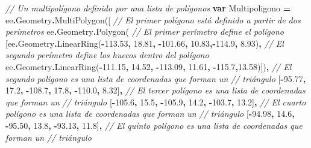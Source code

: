 \documentclass[
  12pt,
  letterpaper,
  twoside]{book}
\newenvironment{Shaded}{\begin{snugshade}}{\end{snugshade}}
\newcommand{\AttributeTok}[1]{\textcolor[rgb]{0.77,0.63,0.00}{#1}}
\newcommand{\CommentTok}[1]{\textcolor[rgb]{0.56,0.35,0.01}{\textit{#1}}}
\newcommand{\FloatTok}[1]{\textcolor[rgb]{0.00,0.00,0.81}{#1}}
\newcommand{\FunctionTok}[1]{\textcolor[rgb]{0.00,0.00,0.00}{#1}}
\newcommand{\KeywordTok}[1]{\textcolor[rgb]{0.13,0.29,0.53}{\textbf{#1}}}
\newcommand{\NormalTok}[1]{#1}
\newcommand{\OperatorTok}[1]{\textcolor[rgb]{0.81,0.36,0.00}{\textbf{#1}}}
\begin{document}
\begin{Shaded}
\begin{Highlighting}[]
\CommentTok{// Un multipolígono definido por una lista de polígonos}
\KeywordTok{var}\NormalTok{ Multipoligono }\OperatorTok{=}\NormalTok{ ee}\OperatorTok{.}\AttributeTok{Geometry}\OperatorTok{.}\FunctionTok{MultiPolygon}\NormalTok{([}
    \CommentTok{// El primer polígono está definido a partir de dos perímetros}
\NormalTok{    ee}\OperatorTok{.}\AttributeTok{Geometry}\OperatorTok{.}\FunctionTok{Polygon}\NormalTok{(  }
\CommentTok{// El primer perímetro define el polígono                }
\NormalTok{      [ee}\OperatorTok{.}\AttributeTok{Geometry}\OperatorTok{.}\FunctionTok{LinearRing}\NormalTok{(}\OperatorTok{{-}}\FloatTok{113.53}\OperatorTok{,} \FloatTok{18.81}\OperatorTok{,} \OperatorTok{{-}}\FloatTok{101.66}\OperatorTok{,} \FloatTok{10.83}\OperatorTok{,{-}}\FloatTok{114.9}\OperatorTok{,} \FloatTok{8.93}\NormalTok{)}\OperatorTok{,}    
      \CommentTok{// El segundo perímetro define los huecos dentro del polígono}
\NormalTok{ee}\OperatorTok{.}\AttributeTok{Geometry}\OperatorTok{.}\FunctionTok{LinearRing}\NormalTok{(}\OperatorTok{{-}}\FloatTok{111.15}\OperatorTok{,} \FloatTok{14.52}\OperatorTok{,} \OperatorTok{{-}}\FloatTok{113.09}\OperatorTok{,} \FloatTok{11.61}\OperatorTok{,} \OperatorTok{{-}}\FloatTok{115.7}\OperatorTok{,}\FloatTok{13.58}\NormalTok{)])}\OperatorTok{,}
    \CommentTok{// El segundo polígono es una lista de coordenadas que forman un }
    \CommentTok{// triángulo}
\NormalTok{    [}\OperatorTok{{-}}\FloatTok{95.77}\OperatorTok{,} \FloatTok{17.2}\OperatorTok{,}
     \OperatorTok{{-}}\FloatTok{108.7}\OperatorTok{,} \FloatTok{17.8}\OperatorTok{,}
     \OperatorTok{{-}}\FloatTok{110.0}\OperatorTok{,} \FloatTok{8.32}\NormalTok{]}\OperatorTok{,}
    \CommentTok{// El tercer polígono es una lista de coordenadas que forman un }
    \CommentTok{// triángulo}
\NormalTok{    [}\OperatorTok{{-}}\FloatTok{105.6}\OperatorTok{,} \FloatTok{15.5}\OperatorTok{,}                
     \OperatorTok{{-}}\FloatTok{105.9}\OperatorTok{,} \FloatTok{14.2}\OperatorTok{,}
     \OperatorTok{{-}}\FloatTok{103.7}\OperatorTok{,} \FloatTok{13.2}\NormalTok{]}\OperatorTok{,}
    \CommentTok{// El cuarto polígono es una lista de coordenadas que forman un }
    \CommentTok{// triángulo}
\NormalTok{    [}\OperatorTok{{-}}\FloatTok{94.98}\OperatorTok{,} \FloatTok{14.6}\OperatorTok{,}         
     \OperatorTok{{-}}\FloatTok{95.50}\OperatorTok{,} \FloatTok{13.8}\OperatorTok{,}
     \OperatorTok{{-}}\FloatTok{93.13}\OperatorTok{,} \FloatTok{11.8}\NormalTok{]}\OperatorTok{,}
    \CommentTok{// El quinto polígono es una lista de coordenadas que forman un }
    \CommentTok{// triángulo}

\end{Highlighting}
\end{Shaded}
\end{document}

